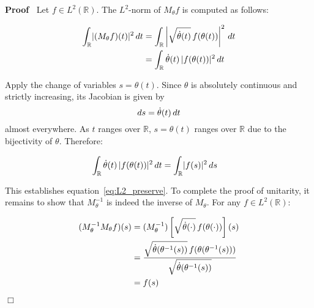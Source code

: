 \documentclass{article}
\newcommand{\cdummy}{\cdot}
\newenvironment{proof}{\noindent\textbf{Proof\ }}{\hspace*{\fill}$\Box$\medskip}
\begin{document}
\begin{proof}
  Let $f \in L^2 (\mathbb{R})$. The $L^2$-norm of $M_{\theta} f$ is computed
  as follows:
  
  \begin{align}
    \int_{\mathbb{R}} \lvert (M_{\theta} f) (t) \rvert^2  \hspace{0.17em} dt &
    = \int_{\mathbb{R}} \left| \sqrt{\dot{\theta} (t)}  \hspace{0.17em} f
    (\theta (t)) \right|^2  \hspace{0.17em} dt \\
    & = \int_{\mathbb{R}} \dot{\theta} (t) \hspace{0.17em} \lvert f (\theta
    (t)) \rvert^2  \hspace{0.17em} dt 
  \end{align}
  
  Apply the change of variables $s = \theta (t)$. Since $\theta$ is absolutely
  continuous and strictly increasing, its Jacobian is given by
  \begin{equation}
    ds = \dot{\theta} (t)  \hspace{0.17em} dt
  \end{equation}
  almost everywhere. As $t$ ranges over $\mathbb{R}$, $s = \theta (t)$ ranges
  over $\mathbb{R}$ due to the bijectivity of $\theta$. Therefore:
  
  \begin{align}
    \int_{\mathbb{R}} \dot{\theta} (t) \hspace{0.17em} \lvert f (\theta (t))
    \rvert^2  \hspace{0.17em} dt & = \int_{\mathbb{R}} \lvert f (s) \rvert^2 
    \hspace{0.17em} ds 
  \end{align}
  
  This establishes equation~\eqref{eq:L2_preserve}. To complete the proof of
  unitarity, it remains to show that $M_{\theta}^{- 1}$ is indeed the inverse
  of $M_{\theta}$. For any $f \in L^2 (\mathbb{R})$:
  
  \begin{align}
    (M_{\theta}^{- 1} M_{\theta} f) (s) & = (M_{\theta}^{- 1})  \left[
    \sqrt{\dot{\theta} (\cdummy)}  \hspace{0.17em} f (\theta (\cdot)) \right]
    (s) \\
    & = \frac{\sqrt{\dot{\theta} (\theta^{- 1} (s))}  \hspace{0.17em} f
    (\theta (\theta^{- 1} (s)))}{\sqrt{\dot{\theta} (\theta^{- 1} (s))}} \\
    & = f (s) 
  \end{align}
  

\end{proof}
\end{document}
